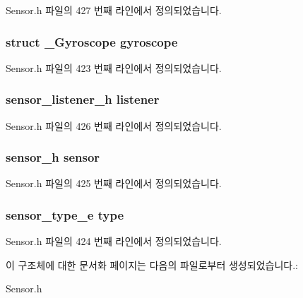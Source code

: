 Sensor.\-h 파일의 427 번째 라인에서 정의되었습니다.

\hypertarget{struct__GyroscopeExtend_a2836faf982e7b52971a419061d4a4ae7}{
\subsubsection[{gyroscope}]{\setlength{\rightskip}{0pt plus 5cm}struct {\bf \-\_\-\-Gyroscope} gyroscope}}\label{struct__GyroscopeExtend_a2836faf982e7b52971a419061d4a4ae7}


Sensor.\-h 파일의 423 번째 라인에서 정의되었습니다.

\hypertarget{struct__GyroscopeExtend_aa977dfb866b24fd7d9a20a9a01b2fd1f}{
\subsubsection[{listener}]{\setlength{\rightskip}{0pt plus 5cm}sensor\-\_\-listener\-\_\-h listener}}\label{struct__GyroscopeExtend_aa977dfb866b24fd7d9a20a9a01b2fd1f}


Sensor.\-h 파일의 426 번째 라인에서 정의되었습니다.

\hypertarget{struct__GyroscopeExtend_a5bae9b7801bc3808411925cde81d3f26}{
\subsubsection[{sensor}]{\setlength{\rightskip}{0pt plus 5cm}sensor\-\_\-h sensor}}\label{struct__GyroscopeExtend_a5bae9b7801bc3808411925cde81d3f26}


Sensor.\-h 파일의 425 번째 라인에서 정의되었습니다.

\hypertarget{struct__GyroscopeExtend_abffb09766da2fc510a79bb51f82a36e1}{
\subsubsection[{type}]{\setlength{\rightskip}{0pt plus 5cm}sensor\-\_\-type\-\_\-e type}}\label{struct__GyroscopeExtend_abffb09766da2fc510a79bb51f82a36e1}


Sensor.\-h 파일의 424 번째 라인에서 정의되었습니다.



이 구조체에 대한 문서화 페이지는 다음의 파일로부터 생성되었습니다.\-:\begin{DoxyCompactItemize}
\item 
Sensor.\-h\end{DoxyCompactItemize}
